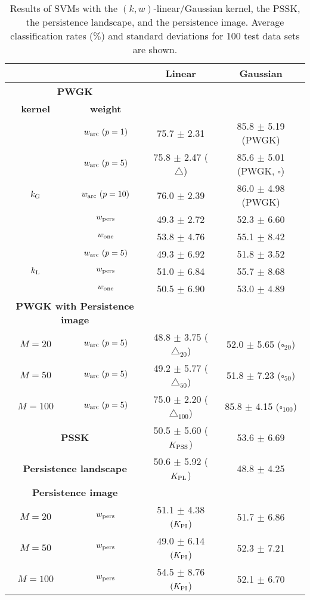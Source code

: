\documentclass{article}
\begin{document}
\begin{table}[htbp]
\caption{Results of SVMs with the $(k,w)$-linear/Gaussian kernel, the PSSK, the persistence landscape, and the persistence image. Average classification rates ($\%$) and standard deviations for 100 test data sets are shown.}\label{table:Synth_results}
\centering
\begin{tabular}{ c  c | c | c }
\hline
\multicolumn{2}{c|}{} & Linear  & Gaussian \\ \hline
\multicolumn{2}{c|}{\textbf{PWGK}} &  	&    \\  
\textbf{kernel} & \textbf{weight} &  &  \\
			& $w_{{\rm arc}} \ (p=1)$ 	&  75.7 $\pm$ 2.31   		& 85.8 $\pm$ 5.19 (PWGK) \\
			& $w_{{\rm arc}} \ (p=5)$ 	&  75.8 $\pm$ 2.47 ($\triangle$)		& 85.6 $\pm$ 5.01 (PWGK, $\square$) \\
$k_{{\rm G}}$   & $w_{{\rm arc}} \ (p=10)$ &  76.0 $\pm$ 2.39		& 86.0 $\pm$ 4.98 (PWGK) \\
			& $w_{{\rm pers}}$ 		&  49.3 $\pm$ 2.72  		& 52.3 $\pm$ 6.60  \\
			& $w_{{\rm one}}$ 		&  53.8 $\pm$ 4.76 		& 55.1 $\pm$ 8.42 \\ \hline
			& $w_{{\rm arc}} \ (p=5)$ 	&  49.3 $\pm$ 6.92		& 51.8 $\pm$ 3.52 \\
$k_{{\rm L}}$	& $w_{{\rm pers}}$ 		&  51.0 $\pm$ 6.84		& 55.7 $\pm$ 8.68 \\
			& $w_{{\rm one}}$ 		&  50.5 $\pm$ 6.90		& 53.0 $\pm$ 4.89 \\ \hline
\multicolumn{2}{c|}{\textbf{PWGK with Persistence image}} &  	&    \\  
$M=20$		& $w_{{\rm arc}} \ (p=5)$	&  48.8 $\pm$ 3.75 ($\triangle_{20}$)		& 52.0 $\pm$ 5.65 ($\square_{20}$) \\
$M=50$		& $w_{{\rm arc}} \ (p=5)$ 	&  49.2 $\pm$ 5.77 ($\triangle_{50}$)		& 51.8 $\pm$ 7.23 ($\square_{50}$) \\
$M=100$		& $w_{{\rm arc}} \ (p=5)$ 	&  75.0 $\pm$ 2.20 ($\triangle_{100}$)		& 85.8 $\pm$ 4.15 ($\square_{100}$) \\  \hline
\multicolumn{2}{c|}{\textbf{PSSK} }				&  50.5 $\pm$ 5.60 ($K_{{\rm PSS}}$) 	& 53.6 $\pm$ 6.69 \\ \hline
\multicolumn{2}{c|}{\textbf{Persistence landscape}}   &   50.6 $\pm$ 5.92 ($K_{{\rm PL}}$) 	& 48.8 $\pm$ 4.25   \\  \hline
\multicolumn{2}{c|}{\textbf{Persistence image}} &  	&    \\  
$M=20$		& $w_{{\rm pers}}$	 	&  51.1 $\pm$ 4.38  $(K_{{\rm PI}}$)	& 51.7 $\pm$ 6.86  \\
$M=50$		& $w_{{\rm pers}}$	 	&  49.0 $\pm$ 6.14  $(K_{{\rm PI}}$)	& 52.3 $\pm$ 7.21  \\
$M=100$		& $w_{{\rm pers}}$	 	&  54.5 $\pm$ 8.76  $(K_{{\rm PI}}$)	& 52.1 $\pm$ 6.70  \\ \hline
\end{tabular}
\end{table}
\end{document}
